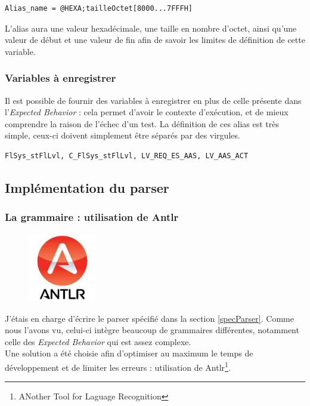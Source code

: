 \begin{lstlisting}[caption=Exemple de définition d'alias local, language=Algo]
Alias_name = @HEXA;tailleOctet[8000...7FFFH]
\end{lstlisting}
L'alias aura une valeur hexadécimale, une taille en nombre d'octet, ainsi qu'une valeur de début et une valeur de fin afin de savoir les limites de définition de cette variable.

\subsubsection{Variables à enregistrer}
Il est possible de fournir des variables à enregistrer en plus de celle présente dans l'\textit{Expected Behavior} : cela permet d'avoir le contexte d'exécution, et de mieux comprendre la raison de l'échec d'un test. La définition de ces alias est très simple, ceux-ci doivent simplement être séparés par des virgules.

\begin{lstlisting}[caption=Exemple de définition d'alias à enregistrer, language=Algo]
FlSys_stFlLvl, C_FlSys_stFlLvl, LV_REQ_ES_AAS, LV_AAS_ACT
\end{lstlisting}


	\subsection{Implémentation du parser}
		\subsubsection{La grammaire : utilisation de Antlr}
		\begin{figure}
			\includegraphics[width=3cm]{contents/images/antlr.jpg}
		\end{figure}
		J'étais en charge d'écrire le parser spécifié dans la section \ref{specParser}. Comme nous l'avons vu, celui-ci intègre beaucoup de grammaires différentes, notamment celle des \textit{Expected Behavior} qui est assez complexe. \\
		Une solution a été choisie afin d'optimiser au maximum le temps de développement et de limiter les erreurs : utilisation de Antlr\footnote{ANother Tool for Laguage Recognition}.

